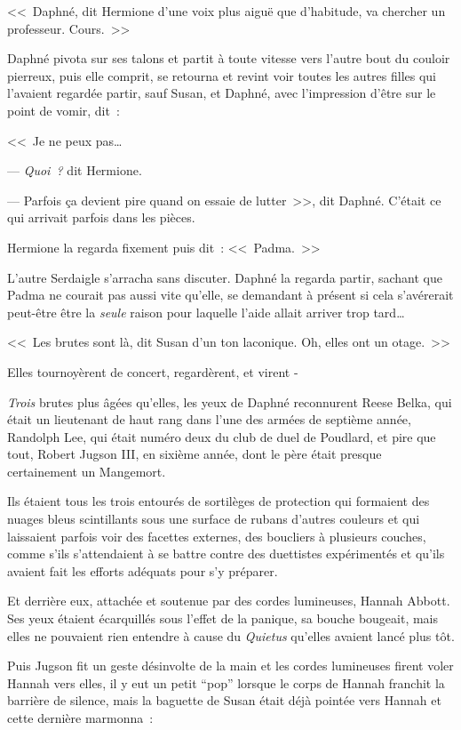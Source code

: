 <<~Daphné, dit Hermione d'une voix plus aiguë que d'habitude, va chercher un professeur. Cours.~>>

Daphné pivota sur ses talons et partit à toute vitesse vers l'autre bout du couloir pierreux, puis elle comprit, se retourna et revint voir toutes les autres filles qui l'avaient regardée partir, sauf Susan, et Daphné, avec l'impression d'être sur le point de vomir, dit~:

<<~Je ne peux pas…

--- \emph{Quoi~?} dit Hermione.

--- Parfois ça devient pire quand on essaie de lutter~>>, dit Daphné. C'était ce qui arrivait parfois dans les pièces.

Hermione la regarda fixement puis dit~: <<~Padma.~>>

L'autre Serdaigle s'arracha sans discuter. Daphné la regarda partir, sachant que Padma ne courait pas aussi vite qu'elle, se demandant à présent si cela s'avérerait peut-être être la \emph{seule} raison pour laquelle l'aide allait arriver trop tard…

<<~Les brutes sont là, dit Susan d'un ton laconique. Oh, elles ont un otage.~>>

Elles tournoyèrent de concert, regardèrent, et virent -

\emph{Trois} brutes plus âgées qu'elles, les yeux de Daphné reconnurent Reese Belka, qui était un lieutenant de haut rang dans l'une des armées de septième année, Randolph Lee, qui était numéro deux du club de duel de Poudlard, et pire que tout, Robert Jugson III, en sixième année, dont le père était presque certainement un Mangemort.

Ils étaient tous les trois entourés de sortilèges de protection qui formaient des nuages bleus scintillants sous une surface de rubans d'autres couleurs et qui laissaient parfois voir des facettes externes, des boucliers à plusieurs couches, comme s'ils s'attendaient à se battre contre des duettistes expérimentés et qu'ils avaient fait les efforts adéquats pour s'y préparer.

Et derrière eux, attachée et soutenue par des cordes lumineuses, Hannah Abbott. Ses yeux étaient écarquillés sous l'effet de la panique, sa bouche bougeait, mais elles ne pouvaient rien entendre à cause du \emph{Quietus} qu'elles avaient lancé plus tôt.

Puis Jugson fit un geste désinvolte de la main et les cordes lumineuses firent voler Hannah vers elles, il y eut un petit “pop” lorsque le corps de Hannah franchit la barrière de silence, mais la baguette de Susan était déjà pointée vers Hannah et cette dernière marmonna~:

